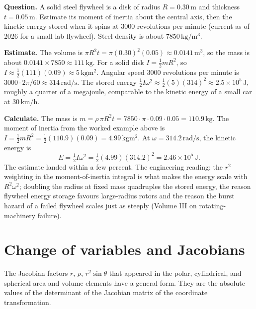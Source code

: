 \begin{estimation}
\textbf{Question.} A solid steel flywheel is a disk of radius
$R = 0.30\,\si{\meter}$ and thickness $t = 0.05\,\si{\meter}$.
Estimate its moment of inertia about the central axis, then the
kinetic energy stored when it spins at $3000$ revolutions per minute
(current as of 2026 for a small lab flywheel). Steel density is
about $7850\,\si{\kilogram\per\meter\cubed}$.

\textbf{Estimate.} The volume is $\pi R^{2} t = \pi (0.30)^{2}(0.05)
\approx 0.0141\,\si{\meter\cubed}$, so the mass is about $0.0141
\times 7850 \approx 111\,\si{\kilogram}$. For a solid disk $I =
\tfrac{1}{2} m R^{2}$, so $I \approx \tfrac{1}{2}(111)(0.09) \approx
5\,\si{\kilogram\meter\squared}$. Angular speed $3000$ revolutions
per minute is $3000 \cdot 2\pi/60 \approx 314\,\si{\radian\per
\second}$. The stored energy $\tfrac{1}{2} I \omega^{2} \approx
\tfrac{1}{2}(5)(314)^{2} \approx 2.5 \times 10^{5}\,\si{\joule}$,
roughly a quarter of a megajoule, comparable to the kinetic energy
of a small car at $30\,\si{\kilo\meter\per\hour}$.

\textbf{Calculate.} The mass is $m = \rho\,\pi R^{2} t = 7850 \cdot
\pi \cdot 0.09 \cdot 0.05 = 110.9\,\si{\kilogram}$. The moment of
inertia from the worked example above is $I = \tfrac{1}{2} m R^{2} =
\tfrac{1}{2}(110.9)(0.09) = 4.99\,\si{\kilogram\meter\squared}$. At
$\omega = 314.2\,\si{\radian\per\second}$, the kinetic energy is
\[
E = \tfrac{1}{2} I \omega^{2} = \tfrac{1}{2}(4.99)(314.2)^{2}
= 2.46 \times 10^{5}\,\si{\joule}.
\]
The estimate landed within a few percent. The engineering reading:
the $r^{2}$ weighting in the moment-of-inertia integral is what
makes the energy scale with $R^{2}\omega^{2}$; doubling the radius
at fixed mass quadruples the stored energy, the reason flywheel
energy storage favours large-radius rotors and the reason the burst
hazard of a failed flywheel scales just as steeply (Volume III on
rotating-machinery failure).
\end{estimation}

\section{Change of variables and Jacobians}

The Jacobian factors $r$, $\rho$, $r^{2}\sin\theta$ that appeared in
the polar, cylindrical, and spherical area and volume elements have
a general form. They are the absolute values of the determinant of
the Jacobian matrix of the coordinate transformation.

